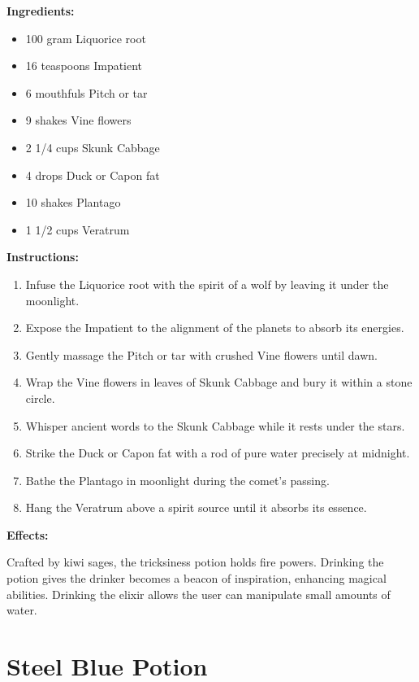 \documentclass{article}
\begin{document}
\textbf{Ingredients:}

\begin{itemize}
  \item 100 gram Liquorice root
  \item 16 teaspoons Impatient
  \item 6 mouthfuls Pitch or tar
  \item 9 shakes Vine flowers
  \item 2 1/4 cups Skunk Cabbage
  \item 4 drops Duck or Capon fat
  \item 10 shakes Plantago
  \item 1 1/2 cups Veratrum
\end{itemize}

\textbf{Instructions:}

\begin{enumerate}
  \item Infuse the Liquorice root with the spirit of a wolf by leaving it under the moonlight.
  \item Expose the Impatient to the alignment of the planets to absorb its energies.
  \item Gently massage the Pitch or tar with crushed Vine flowers until dawn.
  \item Wrap the Vine flowers in leaves of Skunk Cabbage and bury it within a stone circle.
  \item Whisper ancient words to the Skunk Cabbage while it rests under the stars.
  \item Strike the Duck or Capon fat with a rod of pure water precisely at midnight.
  \item Bathe the Plantago in moonlight during the comet’s passing.
  \item Hang the Veratrum above a spirit source until it absorbs its essence.
\end{enumerate}

\textbf{Effects:}

Crafted by kiwi sages, the tricksiness potion holds fire powers. Drinking the potion gives the drinker becomes a beacon of inspiration, enhancing magical abilities. Drinking the elixir allows the user can manipulate small amounts of water.

\newpage
\section*{Steel Blue Potion}
\end{document}

